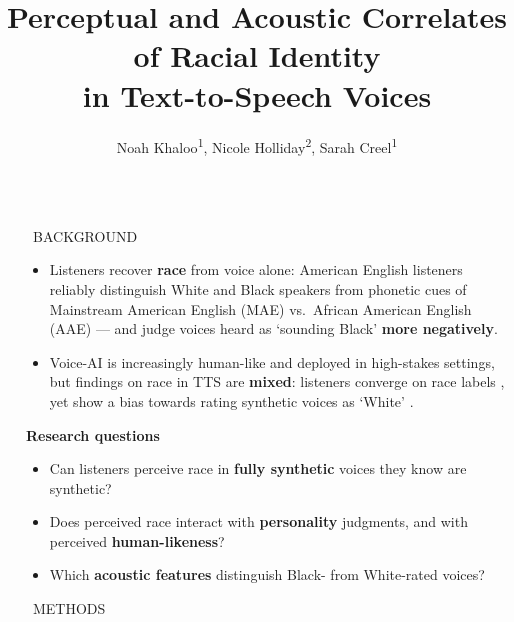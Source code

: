 \documentclass[final,20pt]{beamer}
\title{Perceptual and Acoustic Correlates of Racial Identity \\ in Text-to-Speech Voices}
\author{Noah Khaloo\textsuperscript{1}, Nicole Holliday\textsuperscript{2}, Sarah Creel\textsuperscript{1}}
\institute[shortinst]{\textsuperscript{1}UC San Diego \quad \textsuperscript{2}UC Berkeley}
\newlength{\sepwidth}
\newlength{\colwidth}
\newcommand{\separatorcolumn}{\begin{column}{\sepwidth}\end{column}}
\begin{document}
\renewcommand{\arraystretch}{1.15}
\begin{frame}[t]
\begin{columns}[t]
\separatorcolumn

\begin{column}{\colwidth}

\begin{block}{~BACKGROUND}

    \begin{itemize}
        \item Listeners recover \textbf{race} from voice alone: American English listeners reliably distinguish White and Black speakers from phonetic cues of Mainstream American English (MAE) vs.\ African American English (AAE) \citep{purnell_perceptual_1999,thomas_delimiting_2004} --- and judge voices heard as `sounding Black' \textbf{more negatively}.
        \item Voice-AI is increasingly human-like and deployed in high-stakes settings, but findings on race in TTS are \textbf{mixed}: listeners converge on race labels \citep{holliday_siri_2023}, yet show a bias towards rating synthetic voices as `White' \citep{pinhanez_harnessing_2024}.
    \end{itemize}

    \vspace{.5em}
    \textbf{Research questions}
    \begin{itemize}
        \item[\textbf{Q1}] Can listeners perceive race in \textbf{fully synthetic} voices they know are synthetic?
        \item[\textbf{Q2}] Does perceived race interact with \textbf{personality} judgments, and with perceived \textbf{human-likeness}?
        \item[\textbf{Q3}] Which \textbf{acoustic features} distinguish Black- from White-rated voices?
    \end{itemize}

\end{block}

\begin{block}{~METHODS}


\end{block}
\end{column}
\end{columns}
\end{frame}
\end{document}
